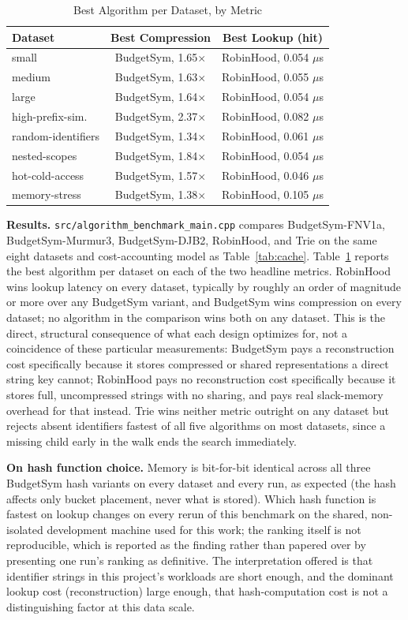 \documentclass[conference]{IEEEtran}
\begin{document}
\begin{table}[htbp]
\caption{Best Algorithm per Dataset, by Metric}
\label{tab:algocompare}
\centering
\small
\begin{tabular}{lcc}
\toprule
Dataset & Best Compression & Best Lookup (hit) \\
\midrule
small & BudgetSym, 1.65$\times$ & RobinHood, 0.054 $\mu$s \\
medium & BudgetSym, 1.63$\times$ & RobinHood, 0.055 $\mu$s \\
large & BudgetSym, 1.64$\times$ & RobinHood, 0.054 $\mu$s \\
high-prefix-sim. & BudgetSym, 2.37$\times$ & RobinHood, 0.082 $\mu$s \\
random-identifiers & BudgetSym, 1.34$\times$ & RobinHood, 0.061 $\mu$s \\
nested-scopes & BudgetSym, 1.84$\times$ & RobinHood, 0.054 $\mu$s \\
hot-cold-access & BudgetSym, 1.57$\times$ & RobinHood, 0.046 $\mu$s \\
memory-stress & BudgetSym, 1.38$\times$ & RobinHood, 0.105 $\mu$s \\
\bottomrule
\end{tabular}
\end{table}

\textbf{Results.} \texttt{src/algorithm\_benchmark\_main.cpp} compares
BudgetSym-FNV1a, BudgetSym-Murmur3, BudgetSym-DJB2, RobinHood, and Trie on
the same eight datasets and cost-accounting model as
Table~\ref{tab:cache}. Table~\ref{tab:algocompare} reports the best
algorithm per dataset on each of the two headline metrics. RobinHood wins
lookup latency on every dataset, typically by roughly an order of magnitude
or more over any BudgetSym variant, and BudgetSym wins compression on every
dataset; no algorithm in the comparison wins both on any dataset. This is
the direct, structural consequence of what each design optimizes for, not
a coincidence of these particular measurements: BudgetSym pays a
reconstruction cost specifically because it stores compressed or shared
representations a direct string key cannot; RobinHood pays no
reconstruction cost specifically because it stores full, uncompressed
strings with no sharing, and pays real slack-memory overhead for that
instead. Trie wins neither metric outright on any dataset but rejects
absent identifiers fastest of all five algorithms on most datasets, since a
missing child early in the walk ends the search immediately.

\textbf{On hash function choice.} Memory is bit-for-bit identical across
all three BudgetSym hash variants on every dataset and every run, as
expected (the hash affects only bucket placement, never what is stored).
Which hash function is fastest on lookup changes on every rerun of this
benchmark on the shared, non-isolated development machine used for this
work; the ranking itself is not reproducible, which is reported as the
finding rather than papered over by presenting one run's ranking as
definitive. The interpretation offered is that identifier strings in this
project's workloads are short enough, and the dominant lookup cost
(reconstruction) large enough, that hash-computation cost is not a
distinguishing factor at this data scale.
\end{document}

